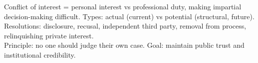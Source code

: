\begin{QuickRevision}
Conflict of interest = personal interest vs professional duty, making impartial decision-making difficult. Types: actual (current) vs potential (structural, future).\\
Resolutions: disclosure, recusal, independent third party, removal from process, relinquishing private interest.\\
Principle: no one should judge their own case. Goal: maintain public trust and institutional credibility.
\end{QuickRevision}
